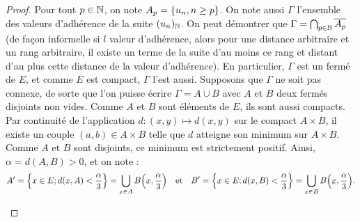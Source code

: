\begin{proof}
Pour tout $p \in \mathbb{N}$, on note $A_p= \{ u_n, n \geq p \}$. 
On note aussi $\Gamma$ l'ensemble des valeurs d'adhérence de la suite $(u_n)_{\mathbb{N}}$.
On peut démontrer que $\Gamma = \bigcap_{p \in \mathbb{N}} \overline{A_p}$ (de façon informelle si $l$ valeur d'adhérence, 
alors pour une distance arbitraire et un rang arbitraire, 
il existe un terme de la suite d'au moins ce rang et distant d'au plus cette distance de la valeur d'adhérence).
En particulier, $\Gamma$ est un fermé de $E$, et comme $E$ est compact, $\Gamma$ l'est aussi. \newline
Supposons que $\Gamma$ ne soit pas connexe, de sorte que l'on puisse écrire $\Gamma = A \cup B$ avec $A$ et $B$ deux fermés disjoints non vides.
Comme $A$ et $B$ sont éléments de $E$, ils sont aussi compacts.
Par continuité de l'application $d : (x,y) \mapsto d(x,y)$ sur le compact $A \times B$, il existe un couple $(a,b) \in A \times B$ telle que 
$d$ atteigne son minimum sur $A \times B$. Comme $A$ et $B$ sont disjoints, ce minimum est strictement positif.
Ainsi, $\alpha = d(A,B) >0$, et on note :
\[ A'  = \Bigl\{ x \in E ; d(x,A) < \dfrac{\alpha}3 \Bigr\} = \bigcup_{x \in A} B\Bigl( x, \dfrac{\alpha}3 \Bigr) \quad \text{et} \quad
	B'  = \Bigl\{ x \in E ; d(x,B) < \dfrac{\alpha}3 \Bigr\} = \bigcup_{x \in B} B\Bigl( x, \dfrac{\alpha}3 \Bigr) . \]
	
	
\begin{center}

\end{center}
\end{proof}
